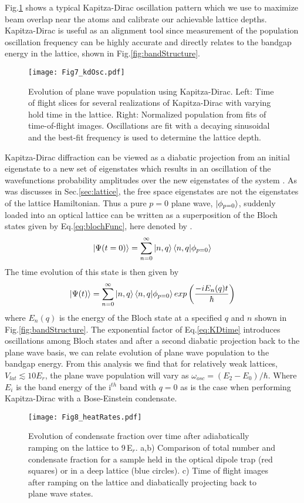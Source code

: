 Fig.\;\ref{fig:KDoscillations} shows a typical Kapitza-Dirac oscillation pattern which we use to maximize beam overlap near the atoms and calibrate our achievable lattice depths. Kapitza-Dirac is useful as an alignment tool since measurement of the population oscillation frequency can be highly accurate and directly relates to the bandgap energy in the lattice, shown in Fig.\;\ref{fig:bandStructure}. 
	\begin{figure}
		\texttt{[image: Fig7\_kdOsc.pdf]}
		\caption{Evolution of plane wave population using Kapitza-Dirac. Left: Time of flight slices for several realizations of Kapitza-Dirac with varying hold time in the lattice. Right: Normalized population from fits of time-of-flight images. Oscillations are fit with a decaying sinusoidal and the best-fit frequency is used to determine the lattice depth.}
		\label{fig:KDoscillations}
	\end{figure}
Kapitza-Dirac diffraction can be viewed as a diabatic projection from an initial eigenstate to a new set of eigenstates which results in an oscillation of the wavefunctions probability amplitudes over the new eigenstates of the system \cite{Denschlag2002}. As was discusses in Sec.\;\ref{sec:lattice}, the free space eigenstates are not the eigenstates of the lattice Hamiltonian. Thus a pure $p=0$ plane wave, $\left| {\phi_{p=0}} \right>$, suddenly loaded into an optical lattice can be written as a superposition of the Bloch states given by Eq.\;\ref{eq:blochFunc}, here denoted by .
	\begin{equation} \label{eq:p0inBloch}
		\left| {\Psi(t=0)} \right> = \sum_{n=0}^{\infty} \left| {n,q} \right> \left< {n,q} | {\phi_{p=0}} \right>
	\end{equation}
The time evolution of this state is then given by
	\begin{equation} \label{eq:KDtime}
		\left| {\Psi(t)} \right> = \sum_{n=0}^{\infty} \left| {n,q} \right> \left< {n,q} | {\phi_{p=0}} \right> exp \left( \frac{-i E_n(q) t}{\hbar} \right)
	\end{equation}
where $E_n(q)$ is the energy of the Bloch state at a specified $q$ and $n$ shown in Fig.\;\ref{fig:bandStructure}. The exponential factor of Eq.\;\ref{eq:KDtime} introduces oscillations among Bloch states and after a second diabatic projection back to the plane wave basis, we can relate evolution of plane wave population to the bandgap energy. From this analysis we find that for relatively weak lattices, $V_{lat} \lesssim 10 E_r$, the plane wave population will vary as $\omega_{osc} = (E_2 - E_0) / \hbar$. Where $E_i$ is the band energy of the i$^{th}$ band with $q=0$ as is the case when performing Kapitza-Dirac with a Bose-Einstein condensate.
	\begin{figure}
		\texttt{[image: Fig8\_heatRates.pdf]}
		\caption{Evolution of condensate fraction over time after adiabatically ramping on the lattice to 9\,E$_r$. a,b) Comparison of total number and condensate fraction for a sample held in the optical dipole trap (red squares) or in a deep lattice (blue circles). c) Time of flight images after ramping on the lattice and diabatically projecting back to plane wave states. }
		\label{fig:heatingRates}
	\end{figure} 
	


